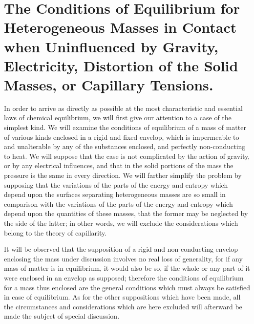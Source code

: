 \documentclass[12pt]{memoir}
\begin{document}
\section{The Conditions of Equilibrium for Heterogeneous Masses in Contact when Uninfluenced by Gravity, Electricity, Distortion of the Solid Masses, or Capillary Tensions.}

In order to arrive as directly as possible at the most characteristic and essential laws of chemical equilibrium, we will first give our attention to a case of the simplest kind. We will examine the conditions of equilibrium of a mass of matter of various kinds enclosed in a rigid and fixed envelop, which is impermeable to and unalterable by any of the substances enclosed, and perfectly non-conducting to heat. We will suppose that the case is not complicated by the action of gravity, or by any electrical influences, and that in the solid portions of the mass the pressure is the same in every direction. We will farther simplify the problem by supposing that the variations of the parts of the energy and entropy which depend upon the surfaces separating heterogeneous masses are so small in comparison with the variations of the parts of the energy and entropy which depend upon the quantities of these masses, that the former may be neglected by the side of the latter; in other words, we will exclude the considerations which belong to the theory of capillarity.

It will be observed that the supposition of a rigid and non-conducting envelop enclosing the mass under discussion involves no real loss of generality, for if any mass of matter is in equilibrium, it would also be so, if the whole or any part of it were enclosed in an envelop as supposed; therefore the conditions of equilibrium for a mass thus enclosed are the general conditions which must always be satisfied in case of equilibrium. As for the other suppositions which have been made, all the circumstances and considerations which are here excluded will afterward be made the subject of special discussion.
\end{document}
